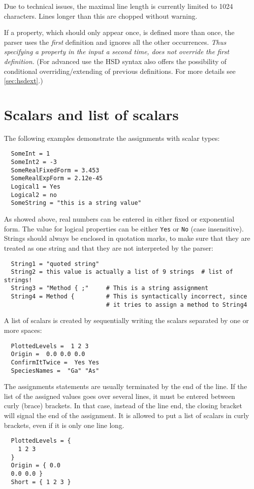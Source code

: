 Due to technical issues, the maximal line length is currently limited to 1024
characters. Lines longer than this are chopped without warning.

If a property, which should only appear once, is defined more than once, the
parser uses the \emph{first} definition and ignores all the other occurrences.
\emph{Thus specifying a property in the input a second time, does not override
  the first definition.} (For advanced use the HSD syntax also offers the
possibility of conditional overriding/extending of previous definitions. For
more details see \ref{sec:hsdext}.)


\section{Scalars and list of scalars}

The following examples demonstrate the assignments with scalar types:
\begin{verbatim}
  SomeInt = 1
  SomeInt2 = -3
  SomeRealFixedForm = 3.453
  SomeRealExpForm = 2.12e-45
  Logical1 = Yes
  Logical2 = no
  SomeString = "this is a string value"
\end{verbatim}

As showed above, real numbers can be entered in either fixed or
exponential form. The value for logical properties can be either
\verb|Yes| or \verb|No| (case insensitive). Strings should always be
enclosed in quotation marks, to make sure that they are treated as one
string and that they are not interpreted by the parser:
\begin{verbatim}
  String1 = "quoted string"
  String2 = this value is actually a list of 9 strings  # list of strings!
  String3 = "Method { ;"     # This is a string assignment
  String4 = Method {         # This is syntactically incorrect, since
                             # it tries to assign a method to String4
\end{verbatim}

A list of scalars is created by sequentially writing the scalars
separated by one or more spaces:
\begin{verbatim}
  PlottedLevels =  1 2 3 
  Origin =  0.0 0.0 0.0 
  ConfirmItTwice =  Yes Yes 
  SpeciesNames =  "Ga" "As"
\end{verbatim}

The assignments statements are usually terminated by the end of the
line.  If the list of the assigned values goes over several lines, it
must be entered between curly (brace) brackets. In that case, instead
of the line end, the closing bracket will signal the end of the
assignment.  It is allowed to put a list of scalars in curly brackets,
even if it is only one line long.
\begin{verbatim}
  PlottedLevels = {
    1 2 3
  }
  Origin = { 0.0
  0.0 0.0 }
  Short = { 1 2 3 }
\end{verbatim}

